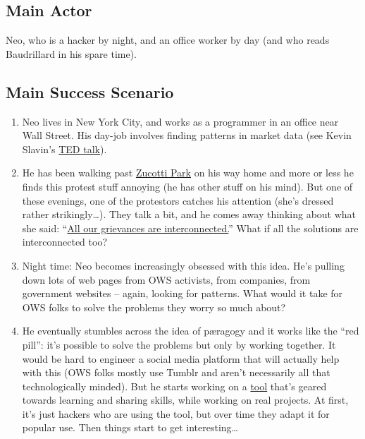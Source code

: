 \subsection{Main Actor}

Neo, who is a hacker by night, and an office worker by day (and who
reads Baudrillard in his spare time).

\subsection{Main Success Scenario}

\begin{enumerate}
\item
  Neo lives in New York City, and works as a programmer in an office
  near Wall Street. His day-job involves finding patterns in market data
  (see Kevin Slavin's
  \href{http://www.ted.com/talks/kevin\_slavin\_how\_algorithms\_shape\_our\_world.html}{TED
  talk}).
\item
  He has been walking past
  \href{http://en.wikipedia.org/wiki/Zuccotti\_Park}{Zucotti Park} on
  his way home and more or less he finds this protest stuff annoying (he
  has other stuff on his mind). But one of these evenings, one of the
  protestors catches his attention (she's dressed rather
  strikingly\ldots{}). They talk a bit, and he comes away thinking about
  what she said:
  ``\href{http://www.nycga.net/files/2011/11/DeclarationFlowchart\_v2\_large.jpg}{All
  our grievances are interconnected.}'' What if all the solutions are
  interconnected too?
\item
  Night time: Neo becomes increasingly obsessed with this idea. He's
  pulling down lots of web pages from OWS activists, from companies,
  from government websites -- again, looking for patterns. What would it
  take for OWS folks to solve the problems they worry so much about?
\item
  He eventually stumbles across the idea of pæragogy and it works like
  the ``red pill'': it's possible to solve the problems but only by
  working together. It would be hard to engineer a social media platform
  that will actually help with this (OWS folks mostly use Tumblr and
  aren't necessarily all that technologically minded). But he starts
  working on a
  \href{http://campus.ftacademy.org/wiki/index.php/Free\_Technology\_Guild}{tool}
  that's geared towards learning and sharing skills, while working on
  real projects. At first, it's just hackers who are using the tool, but
  over time they adapt it for popular use. Then things start to get
  interesting\ldots{}
\end{enumerate}
